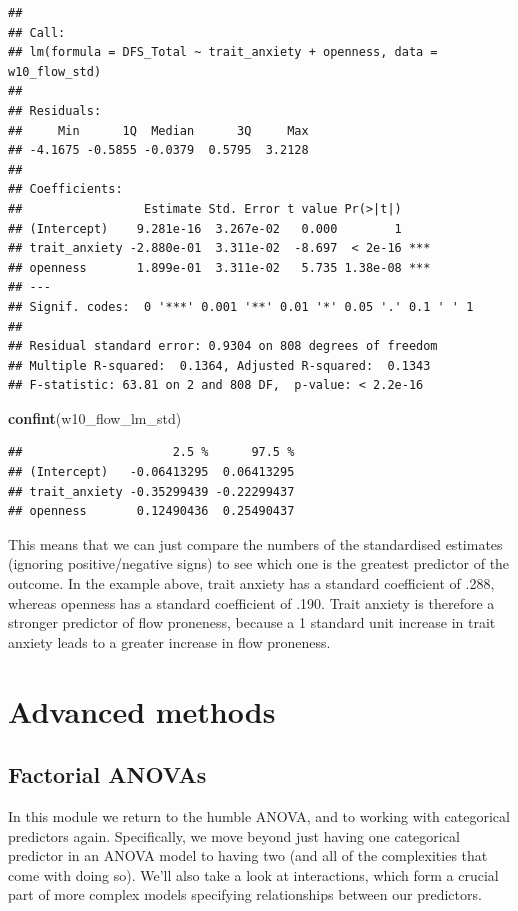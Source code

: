 \documentclass[
]{book}
\newenvironment{Shaded}{\begin{snugshade}}{\end{snugshade}}
\newcommand{\FunctionTok}[1]{\textcolor[rgb]{0.13,0.29,0.53}{\textbf{#1}}}
\newcommand{\NormalTok}[1]{#1}
\begin{document}
\begin{verbatim}
## 
## Call:
## lm(formula = DFS_Total ~ trait_anxiety + openness, data = w10_flow_std)
## 
## Residuals:
##     Min      1Q  Median      3Q     Max 
## -4.1675 -0.5855 -0.0379  0.5795  3.2128 
## 
## Coefficients:
##                 Estimate Std. Error t value Pr(>|t|)    
## (Intercept)    9.281e-16  3.267e-02   0.000        1    
## trait_anxiety -2.880e-01  3.311e-02  -8.697  < 2e-16 ***
## openness       1.899e-01  3.311e-02   5.735 1.38e-08 ***
## ---
## Signif. codes:  0 '***' 0.001 '**' 0.01 '*' 0.05 '.' 0.1 ' ' 1
## 
## Residual standard error: 0.9304 on 808 degrees of freedom
## Multiple R-squared:  0.1364, Adjusted R-squared:  0.1343 
## F-statistic: 63.81 on 2 and 808 DF,  p-value: < 2.2e-16
\end{verbatim}

\begin{Shaded}
\begin{Highlighting}[]
\FunctionTok{confint}\NormalTok{(w10\_flow\_lm\_std)}
\end{Highlighting}
\end{Shaded}

\begin{verbatim}
##                     2.5 %      97.5 %
## (Intercept)   -0.06413295  0.06413295
## trait_anxiety -0.35299439 -0.22299437
## openness       0.12490436  0.25490437
\end{verbatim}

This means that we can just compare the numbers of the standardised estimates (ignoring positive/negative signs) to see which one is the greatest predictor of the outcome. In the example above, trait anxiety has a standard coefficient of .288, whereas openness has a standard coefficient of .190. Trait anxiety is therefore a stronger predictor of flow proneness, because a 1 standard unit increase in trait anxiety leads to a greater increase in flow proneness.

\part{Advanced methods}\label{part-advanced-methods}

\chapter{Factorial ANOVAs}\label{factorial-anova}

In this module we return to the humble ANOVA, and to working with categorical predictors again. Specifically, we move beyond just having one categorical predictor in an ANOVA model to having two (and all of the complexities that come with doing so). We'll also take a look at interactions, which form a crucial part of more complex models specifying relationships between our predictors.
\end{document}
